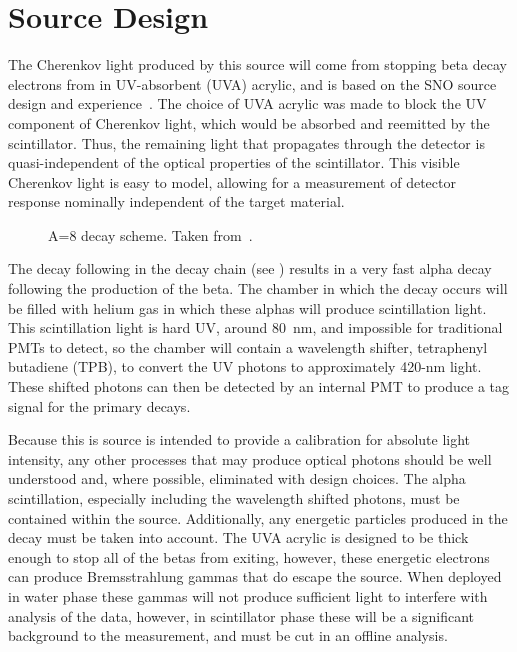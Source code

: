 \section{Source Design}
\label{chap:design}

The Cherenkov light produced by this source will come from stopping beta decay electrons from \Li in UV-absorbent (UVA) acrylic, and is based on the SNO \Li source design and experience~\cite{Tagg:2002,Tagg:2001}.
The choice of UVA acrylic was made to block the UV component of Cherenkov light, which would be absorbed and reemitted by the scintillator.
Thus, the remaining light that propagates through the {\snop} detector is quasi-independent of the optical properties of the {\labppo} scintillator. 
This visible Cherenkov light is easy to model, allowing for a measurement of detector response nominally independent of the target material.

\begin{figure}
\caption{\label{fig:decayscheme} A=8 decay scheme. Taken from~\cite{Tagg:2001}.}
\end{figure}

The decay following \Li in the decay chain (see ) results in a very fast alpha decay following the production of the beta.
The chamber in which the decay occurs will be filled with helium gas in which these alphas will produce scintillation light.
This scintillation light is hard UV, around 80~nm, and impossible for traditional PMTs to detect, so the chamber will contain a wavelength shifter, tetraphenyl butadiene (TPB), to convert the UV photons to approximately 420-nm light.
These shifted photons can then be detected by an internal PMT to produce a tag signal for the primary \Li decays.

Because this is source is intended to provide a calibration for absolute light intensity, any other processes that may produce optical photons should be well understood and, where possible, eliminated with design choices.
The alpha scintillation, especially including the wavelength shifted photons, must be contained within the source. 
Additionally, any energetic particles produced in the \Li decay must be taken into account.
The UVA acrylic is designed to be thick enough to stop all of the \Li betas from exiting, however, these energetic electrons can produce Bremsstrahlung gammas that do escape the source.
When deployed in water phase these gammas will not produce sufficient light to interfere with analysis of the data, however, in scintillator phase these will be a significant background to the measurement, and must be cut in an offline analysis. 

